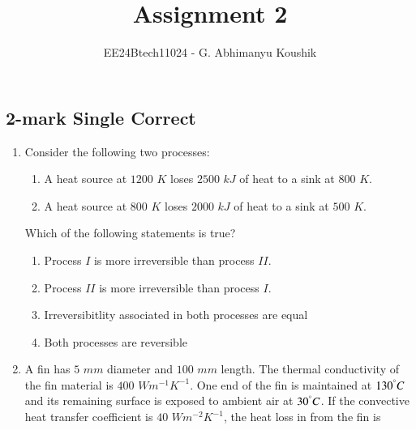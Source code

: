\documentclass[journal,12pt,onecolumn]{IEEEtran}
\theoremstyle{remark}
\begin{document}
\title{Assignment 2}
\author{EE24Btech11024 - G. Abhimanyu Koushik}
\maketitle
\renewcommand{\thefigure}{\theenumi}
\renewcommand{\thetable}{\theenumi}
\subsection*{2-mark Single Correct}
\begin{enumerate}

\item Consider the following two processes:
\begin{enumerate}[label=\alph*., leftmargin=2cm, labelsep=1cm]
    \item A heat source at $1200$ $K$ loses $2500$ $kJ$ of heat to a sink at $800$ $K$.
    \item A heat source at $800$ $K$ loses $2000$ $kJ$ of heat to a sink at $500$ $K$.
\end{enumerate}
Which of the following statements is true?

\hfill{}
\begin{enumerate}
\item Process $I$ is more irreversible than process $II$.
\item Process $II$ is more irreversible than process $I$.
\item Irreversibitlity associated in both processes are equal
\item Both processes are reversible
\end{enumerate}

\item A fin has $5$ $mm$ diameter and $100$ $mm$ length. The thermal conductivity of the fin material is $400$ $Wm^{-1}K^{-1}$. One end of the fin is maintained at $130^\degree C$ and its remaining surface is exposed to ambient air at $30^\degree C$. If the convective heat transfer coefficient is $40$ $Wm^{-2}K^{-1}$, the heat loss in  from the fin is

\hfill{}
\begin{enumerate}
\end{enumerate}


\end{enumerate}
\end{document}
